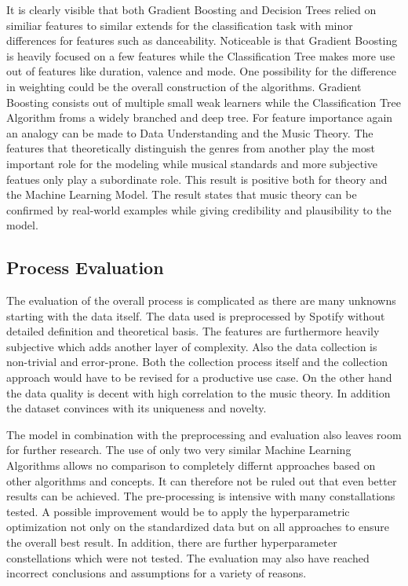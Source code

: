 It is clearly visible that both Gradient Boosting and Decision Trees relied on similiar features to similar extends for the classification task with 
minor differences for features such as danceability. Noticeable is that Gradient Boosting is heavily focused on a few features 
while the Classification Tree makes more use out of features like duration, valence and mode. One possibility for the difference in weighting  
could be the overall construction of the algorithms. Gradient Boosting consists out of multiple small weak learners while the Classification Tree
Algorithm froms a widely branched and deep tree. For feature importance again an analogy can be made to Data Understanding and the Music Theory. 
The features that theoretically distinguish the genres from another play the most important role for the modeling while musical standards and 
more subjective featues only play a subordinate role. This result is positive both for theory and the Machine Learning Model. The result states 
that music theory can be confirmed by real-world examples while giving credibility and plausibility to the model.

\subsection{Process Evaluation}

The evaluation of the overall process is complicated as there are many unknowns starting with the data itself. The data used is preprocessed by 
Spotify without detailed definition and theoretical basis. The features are furthermore heavily subjective which adds another layer of 
complexity. Also the data collection is non-trivial and error-prone. Both the collection process itself and the collection approach 
would have to be revised for a productive use case. On the other hand the data quality is decent with high correlation to the music 
theory. In addition the dataset convinces with its uniqueness and novelty.

The model in combination with the preprocessing and evaluation also leaves room for further research. The use of only two very 
similar Machine Learning Algorithms allows no comparison to completely differnt approaches based on other algorithms and concepts. 
It can therefore not be ruled out that even better results can be achieved. The pre-processing is intensive with many constallations 
tested. A possible improvement would be to apply the hyperparametric optimization not only on the standardized data but on all 
approaches to ensure the overall best result. In addition, there are further hyperparameter constellations which were not tested.
The evaluation may also have reached incorrect conclusions and assumptions for a variety of reasons. 

